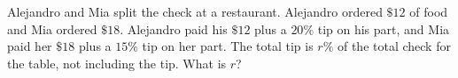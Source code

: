 Alejandro and Mia split the check at a restaurant. Alejandro ordered $\$12$ of food and Mia ordered $\$18$. Alejandro paid his $\$12$ plus a $20\%$ tip on his part, and Mia paid her $\$18$ plus a $15\%$ tip on her part. The total tip is $r\%$ of the total check for the table, not including the tip. What is $r$?
